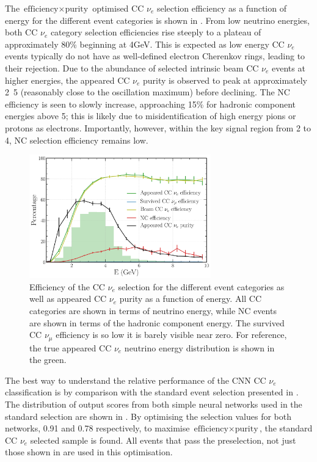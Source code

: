 The $\text{efficiency}\times\text{purity}$ optimised CC $\nu_{e}$ selection efficiency as a
function of energy for the different event categories is shown in
. From low neutrino energies, both CC $\nu_{e}$ category selection
efficiencies rise steeply to a plateau of approximately 80\% beginning at \unit{4}{GeV}. This is
expected as low energy CC $\nu_{e}$ events typically do not have as well-defined electron
Cherenkov rings, leading to their rejection. Due to the abundance of selected intrinsic beam CC
$\nu_{e}$ events at higher energies, the appeared CC $\nu_{e}$ purity is observed to peak at
approximately \unit{2.5}{\GeV} (reasonably close to the oscillation maximum) before declining. The
NC efficiency is seen to slowly increase, approaching 15\% for hadronic component energies above
\unit{5}{\GeV}; this is likely due to misidentification of high energy pions or protons as
electrons. Importantly, however, within the key signal region from 2 to \unit{4}{\GeV}, NC
selection efficiency remains low.

\begin{figure} %
    \includegraphics[width=0.7\textwidth]{diagrams/7-results/final_nuel_hists.pdf}
    \caption[Efficiency of the CC $\nu_{e}$ selection as a function of energy]
    {Efficiency of the CC $\nu_{e}$ selection for the different event categories as well as
        appeared CC $\nu_{e}$ purity as a function of energy. All CC categories are shown in terms
        of neutrino energy, while NC events are shown in terms of the hadronic component energy.
        The survived CC $\nu_{\mu}$ efficiency is so low it is barely visible near zero. For
        reference, the true appeared CC $\nu_{e}$ neutrino energy distribution is shown in the
        green.}
    \label{fig:final_nuel_hists}
\end{figure}

The best way to understand the relative performance of the CNN CC $\nu_{e}$ classification is by
comparison with the standard event selection presented in . The
distribution of output scores from both simple neural networks used in the standard selection are
shown in . By optimising the selection values for both
networks, 0.91 and 0.78 respectively, to maximise $\text{efficiency}\times\text{purity}$, the
standard CC $\nu_{e}$ selected sample is found. All events that pass the preselection, not just
those shown in  are used in this optimisation.

